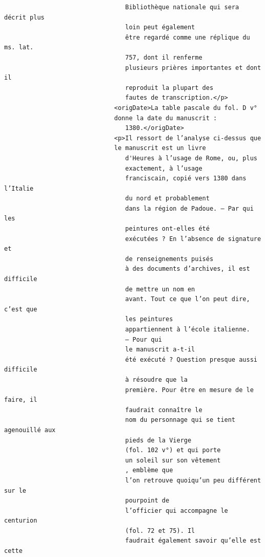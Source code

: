 \documentclass[a4paper,12pt,twoside]{book}
\begin{document}
\begin{verbatim}
                                 Bibliothèque nationale qui sera décrit plus
                                 loin peut également
                                 être regardé comme une réplique du ms. lat.
                                 757, dont il renferme
                                 plusieurs prières importantes et dont il
                                 reproduit la plupart des
                                 fautes de transcription.</p>
                              <origDate>La table pascale du fol. D v°
                              donne la date du manuscrit :
                                 1380.</origDate>
                              <p>Il ressort de l’analyse ci-dessus que 
                              le manuscrit est un livre
                                 d'Heures à l’usage de Rome, ou, plus 
                                 exactement, à l’usage
                                 franciscain, copié vers 1380 dans l’Italie
                                 du nord et probablement
                                 dans la région de Padoue. — Par qui les 
                                 peintures ont-elles été
                                 exécutées ? En l’absence de signature et 
                                 de renseignements puisés
                                 à des documents d’archives, il est difficile 
                                 de mettre un nom en
                                 avant. Tout ce que l’on peut dire, c’est que 
                                 les peintures
                                 appartiennent à l’école italienne. 
                                 — Pour qui 
                                 le manuscrit a-t-il
                                 été exécuté ? Question presque aussi difficile
                                 à résoudre que la
                                 première. Pour être en mesure de le faire, il 
                                 faudrait connaître le
                                 nom du personnage qui se tient agenouillé aux
                                 pieds de la Vierge
                                 (fol. 102 v°) et qui porte
                                 un soleil sur son vêtement
                                 , emblème que
                                 l’on retrouve quoiqu’un peu différent sur le 
                                 pourpoint de
                                 l’officier qui accompagne le centurion 
                                 (fol. 72 et 75). Il
                                 faudrait également savoir qu’elle est cette 

\end{verbatim}
\end{document}
